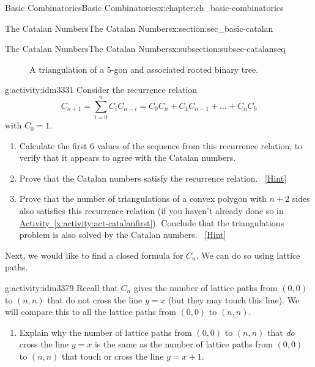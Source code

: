\documentclass[oneside,10pt,]{book}
\numberwithin{equation}{chapter}
\newcommand{\vtx}[2]{node[fill,circle,inner sep=0pt, minimum size=4pt,label=#1:#2]{}}
\newcommand{\va}[1]{\vtx{above}{#1}}
\renewcommand{\v}{\vtx{above}{}}
\begin{document}
\begin{chapterptx}{Basic Combinatorics}{}{Basic Combinatorics}{}{}{x:chapter:ch_basic-combinatorics}
\begin{sectionptx}{The Catalan Numbers}{}{The Catalan Numbers}{}{}{x:section:sec_basic-catalan}
\begin{subsectionptx}{The Catalan Numbers}{}{The Catalan Numbers}{}{}{x:subsection:subsec-catalanseq}
\begin{figure}
\begin{sidebyside}{2}{0.125}{0.125}{0.25}
\begin{sbspanel}{0.25}
        \end{sbspanel}%
\end{sidebyside}%
\caption{A triangulation of a 5-gon and associated rooted binary tree.\label{x:figure:fig-triangulationtree}}
\end{figure}
\begin{activity}{}{g:activity:idm3331}%
Consider the recurrence relation%
\begin{equation*}
C_{n + 1} = \sum_{i = 0}^n C_iC_{n-i} = C_{0}C_{n} + C_{1}C_{n - 1} + \ldots + C_{n}C_{0}
\end{equation*}
with \(C_0 = 1\).%
\begin{enumerate}[font=\bfseries,label=(\alph*),ref=\alph*]
\item{}Calculate the first 6 values of the sequence from this recurrence relation, to verify that it appears to agree with the Catalan numbers.%
\item{}Prove that the Catalan numbers satisfy the recurrence relation.%
\qquad~\hfill{\tiny\hyperlink{g:hint:idm3344-back}{[Hint]}}\item{}Prove that the number of triangulations of a convex polygon with \(n+2\) sides also satisfies this recurrence relation (if you haven't already done so in \hyperref[x:activity:act-catalanfirst]{Activity~\ref{x:activity:act-catalanfirst}}).  Conclude that the triangulations problem is also solved by the Catalan numbers.%
\qquad~\hfill{\tiny\hyperlink{g:hint:idm3369-back}{[Hint]}}\end{enumerate}
\end{activity}
Next, we would like to find a closed formula for \(C_n\).  We can do so using lattice paths.%
\begin{activity}{}{g:activity:idm3379}%
Recall that \(C_n\) gives the number of lattice paths from \((0,0)\) to \((n,n)\) that do not cross the line \(y = x\) (but they may touch this line).  We will compare this to all the lattice paths from \((0,0)\) to \((n,n)\).%
\begin{enumerate}[font=\bfseries,label=(\alph*),ref=\alph*]
\item{}Explain why the number of lattice paths from \((0,0)\) to \((n,n)\) that \emph{do} cross the line \(y = x\) is the same as the number of lattice paths from \((0,0)\) to \((n,n)\) that touch or cross the line \(y = x + 1\).%

\end{enumerate}
\end{activity}
\end{subsectionptx}
\end{sectionptx}
\end{chapterptx}
\end{document}
